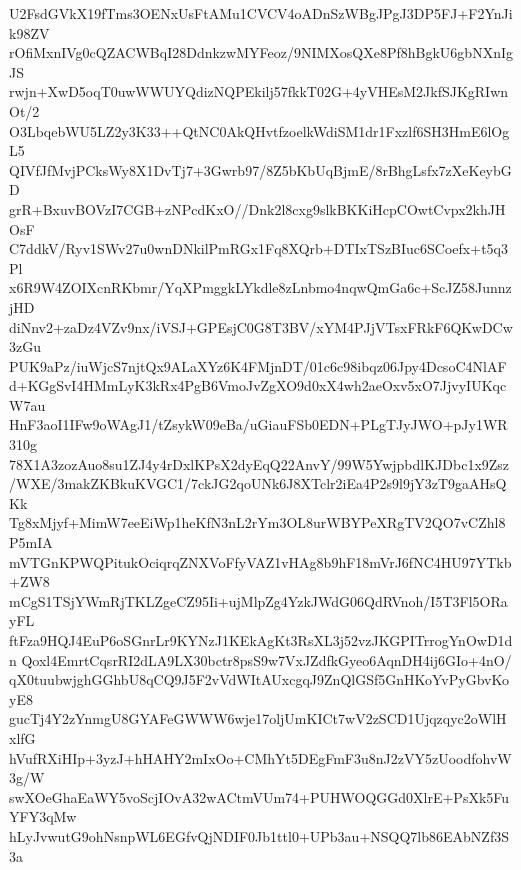 U2FsdGVkX19fTms3OENxUsFtAMu1CVCV4oADnSzWBgJPgJ3DP5FJ+F2YnJik98ZV
rOfiMxnIVg0cQZACWBqI28DdnkzwMYFeoz/9NIMXosQXe8Pf8hBgkU6gbNXnIgJS
rwjn+XwD5oqT0uwWWUYQdizNQPEkilj57fkkT02G+4yVHEsM2JkfSJKgRIwnOt/2
O3LbqebWU5LZ2y3K33++QtNC0AkQHvtfzoelkWdiSM1dr1Fxzlf6SH3HmE6lOgL5
QIVfJfMvjPCksWy8X1DvTj7+3Gwrb97/8Z5bKbUqBjmE/8rBhgLsfx7zXeKeybGD
grR+BxuvBOVzI7CGB+zNPcdKxO//Dnk2l8cxg9slkBKKiHcpCOwtCvpx2khJHOsF
C7ddkV/Ryv1SWv27u0wnDNkilPmRGx1Fq8XQrb+DTIxTSzBIuc6SCoefx+t5q3Pl
x6R9W4ZOIXcnRKbmr/YqXPmggkLYkdle8zLnbmo4nqwQmGa6c+ScJZ58JunnzjHD
diNnv2+zaDz4VZv9nx/iVSJ+GPEsjC0G8T3BV/xYM4PJjVTsxFRkF6QKwDCw3zGu
PUK9aPz/iuWjcS7njtQx9ALaXYz6K4FMjnDT/01c6c98ibqz06Jpy4DcsoC4NlAF
d+KGgSvI4HMmLyK3kRx4PgB6VmoJvZgXO9d0xX4wh2aeOxv5xO7JjvyIUKqcW7au
HnF3aoI1IFw9oWAgJ1/tZsykW09eBa/uGiauFSb0EDN+PLgTJyJWO+pJy1WR310g
78X1A3zozAuo8su1ZJ4y4rDxlKPsX2dyEqQ22AnvY/99W5YwjpbdlKJDbc1x9Zsz
/WXE/3makZKBkuKVGC1/7ckJG2qoUNk6J8XTclr2iEa4P2s9l9jY3zT9gaAHsQKk
Tg8xMjyf+MimW7eeEiWp1heKfN3nL2rYm3OL8urWBYPeXRgTV2QO7vCZhl8P5mIA
mVTGnKPWQPitukOciqrqZNXVoFfyVAZ1vHAg8b9hF18mVrJ6fNC4HU97YTkb+ZW8
mCgS1TSjYWmRjTKLZgeCZ95Ii+ujMlpZg4YzkJWdG06QdRVnoh/I5T3Fl5ORayFL
ftFza9HQJ4EuP6oSGnrLr9KYNzJ1KEkAgKt3RsXL3j52vzJKGPITrrogYnOwD1dn
Qoxl4EmrtCqsrRI2dLA9LX30bctr8psS9w7VxJZdfkGyeo6AqnDH4ij6GIo+4nO/
qX0tuubwjghGGhbU8qCQ9J5F2vVdWItAUxcgqJ9ZnQlGSf5GnHKoYvPyGbvKoyE8
gucTj4Y2zYnmgU8GYAFeGWWW6wje17oljUmKICt7wV2zSCD1Ujqzqyc2oWlHxlfG
hVufRXiHIp+3yzJ+hHAHY2mIxOo+CMhYt5DEgFmF3u8nJ2zVY5zUoodfohvW3g/W
swXOeGhaEaWY5voScjIOvA32wACtmVUm74+PUHWOQGGd0XlrE+PsXk5FuYFY3qMw
hLyJvwutG9ohNsnpWL6EGfvQjNDIF0Jb1ttl0+UPb3au+NSQQ7lb86EAbNZf3S3a
